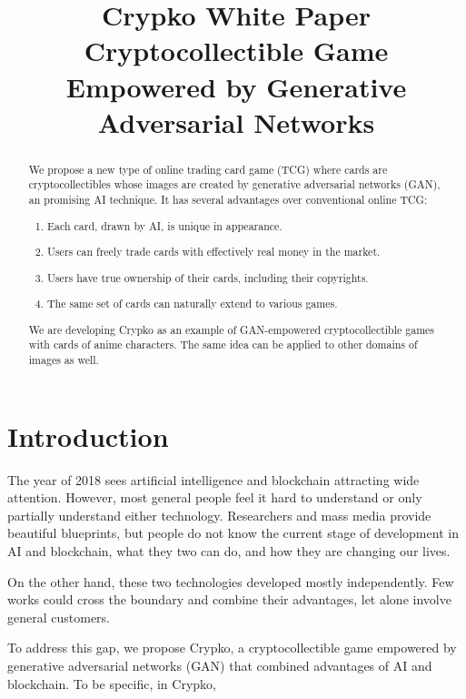 \documentclass[b5paper]{article}
\title{Crypko White Paper \\
  \large Cryptocollectible Game Empowered by Generative Adversarial Networks\\
  \rightline{\small ver 0.9.0 for comike}
}
\author{}
\date{}
\begin{document}
\maketitle
\newpage

\begin{abstract}

We propose a new type of online trading card game (TCG) where cards are cryptocollectibles whose images are created by generative adversarial networks (GAN), an promising AI technique. 
It has several advantages over conventional online TCG:
\begin{enumerate}
\item Each card, drawn by AI, is unique in appearance.
\item Users can freely trade cards with effectively real money in the market.
\item Users have true ownership of their cards, including their copyrights. %
\item The same set of cards can naturally extend to various games. %
\end{enumerate}

We are developing Crypko as an example of GAN-empowered cryptocollectible games with cards of anime characters.
The same idea can be applied to other domains of images as well.

\end{abstract}

\thispagestyle{empty}

\newpage

\section{Introduction}

The year of 2018 sees artificial intelligence and blockchain attracting wide attention.
However, most general people feel it hard to understand or only partially understand either technology. Researchers and mass media provide beautiful blueprints, but people do not know the current stage of development in AI and blockchain, what they two can do, and how they are changing our lives. 

On the other hand, these two technologies developed mostly independently. Few works could cross the boundary and combine their advantages, let alone involve general customers. 

To address this gap, we propose Crypko, a cryptocollectible game empowered by generative adversarial networks (GAN) that combined advantages of AI and blockchain. To be specific, in Crypko,
\end{document}
